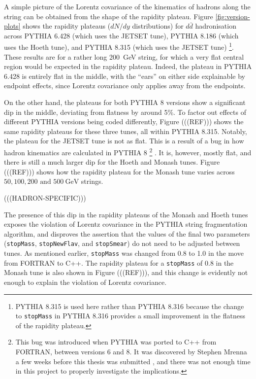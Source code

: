 \documentclass[12pt,a4paper]{report}
\begin{document}

A simple picture of the Lorentz covariance of the kinematics of hadrons along the string can be obtained from the shape of the rapidity plateau. Figure \ref{fig:version-plots} shows the rapidity plateaus ($dN/dy$ distributions) for $d\bar{d}$ hadronisation across PYTHIA 6.428 (which uses the JETSET tune), PYTHIA 8.186 (which uses the Hoeth tune), and PYTHIA 8.315 (which uses the JETSET tune) \footnote{PYTHIA 8.315 is used here rather than PYTHIA 8.316 because the change to \texttt{stopMass} in PYTHIA 8.316 provides a small improvement in the flatness of the rapidity plateau.}. These results are for a rather long \qty{200}{\giga\electronvolt} string, for which a very flat central region would be expected in the rapidity plateau. Indeed, the plateau in PYTHIA 6.428 is entirely flat in the middle, with the ``ears'' on either side explainable by endpoint effects, since Lorentz covariance only applies away from the endpoints.

On the other hand, the plateaus for both PYTHIA 8 versions show a significant dip in the middle, deviating from flatness by around 5\%. To factor out effects of different PYTHIA versions being coded differently, Figure (((REF))) shows the same rapidity plateaus for these three tunes, all within PYTHIA 8.315. Notably, the plateau for the JETSET tune is not as flat. This is a result of a bug in how hadron kinematics are calculated in PYTHIA 8 \footnote{This bug was introduced when PYTHIA was ported to C++ from FORTRAN, between versions 6 and 8. It was discovered by Stephen Mrenna a few weeks before this thesis was submitted \cite{steve}, and there was not enough time in this project to properly investigate the implications.} \cite{steve}. It is, however, mostly flat, and there is still a much larger dip for the Hoeth and Monash tunes. Figure (((REF))) shows how the rapidity plateau for the Monash tune varies across $50, 100, 200 \text{ and } \qty{500}{\giga\electronvolt}$ strings.

(((HADRON-SPECIFIC)))

The presence of this dip in the rapidity plateaus of the Monash and Hoeth tunes exposes the violation of Lorentz covariance in the PYTHIA string fragmentation algorithm, and disproves the assertion that the values of the final two parameters (\texttt{stopMass}, \texttt{stopNewFlav}, and \texttt{stopSmear}) do not need to be adjusted between tunes. As mentioned earlier, \texttt{stopMass} was changed from 0.8 to 1.0 in the move from FORTRAN to C++. The rapidity plateau for a \texttt{stopMass} of 0.8 in the Monash tune is also shown in Figure (((REF))), and this change is evidently not enough to explain the violation of Lorentz covariance.
\end{document}
